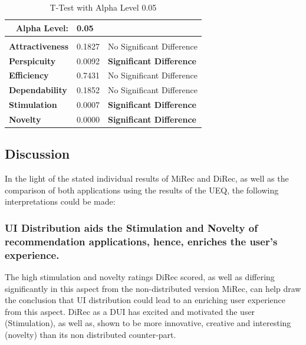 \begin{table}[!htbp]
\centering
\tiny
\begin{tabular}{|l|l|l|}
\hline
\multicolumn{1}{|r|}{Alpha Level:} & 0.05   &                                                         \\ \hline
                                   &        &                                                         \\ \hline
\textbf{Attractiveness}            & 0.1827 & No Significant Difference       \\ \hline
\textbf{Perspicuity}               & 0.0092 & \textbf{Significant Difference} \\ \hline
\textbf{Efficiency}                & 0.7431 & No Significant Difference       \\ \hline
\textbf{Dependability}             & 0.1852 & No Significant Difference       \\ \hline
\textbf{Stimulation}               & 0.0007 & \textbf{Significant Difference} \\ \hline
\textbf{Novelty}                   & 0.0000 & \textbf{Significant Difference} \\ \hline
\end{tabular}
\caption{T-Test with Alpha Level 0.05}
\label{table:table53}
\end{table} 

\subsection{Discussion}
In the light of the stated individual results of MiRec and DiRec, as well as the
comparison of both applications using the results of the UEQ, the following
interpretations could be made:
\subsubsection{UI Distribution aids the Stimulation and Novelty of
recommendation applications, hence, enriches the user's experience.} The high
stimulation and novelty ratings DiRec scored, as well as differing significantly in this aspect
from the non-distributed version MiRec, can help draw the conclusion that UI
distribution could lead to an enriching user experience from this aspect.
DiRec as a DUI has excited and motivated the user (Stimulation), as well as,
shown to be more innovative, creative and interesting (novelty) than its non
distributed counter-part.
 
